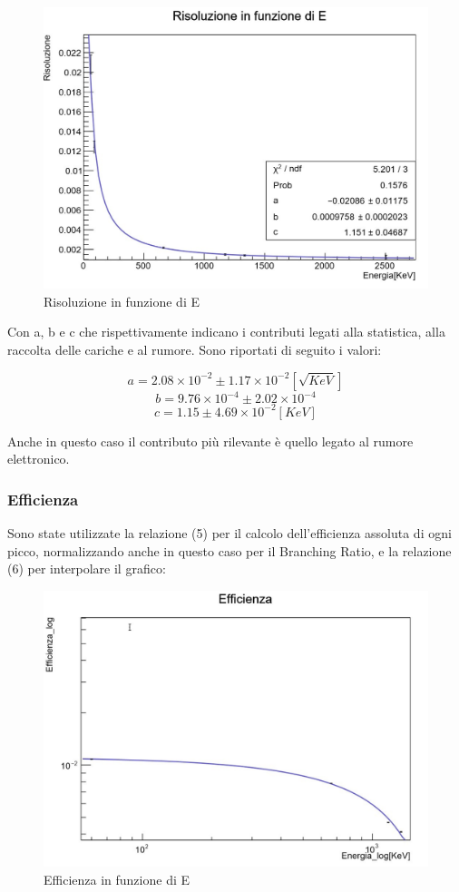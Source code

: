 \documentclass[a4paper,10pt]{article}
\begin{document}
\begin{figure}[H]
    \centering
    \includegraphics[scale=0.45]{grafici/risoluzionemultigamma}
    \caption{Risoluzione in funzione di E}
\end{figure}

Con a, b e c che rispettivamente indicano i contributi legati alla statistica, alla raccolta delle cariche e al rumore. Sono riportati di seguito i valori:

$$
	a=2.08 \times 10^{-2} \pm 1.17 \times 10^{-2} [\sqrt{KeV}]
$$
$$
	b=9.76 \times 10^{-4} \pm 2.02 \times 10^{-4}
$$
$$
	c= 1.15 \pm 4.69 \times 10^{-2} [KeV]
$$

Anche in questo caso il contributo pi\`u rilevante \`e quello legato al rumore elettronico.


\subsubsection{Efficienza}
Sono state utilizzate la relazione (5) per il calcolo dell'efficienza assoluta di ogni picco, normalizzando anche in questo caso per il Branching Ratio, e la relazione (6) per interpolare il grafico:

\begin{figure}[H]
    \centering
    \includegraphics[scale=0.45]{grafici/efficienzamultigamma}
    \caption{Efficienza in funzione di E}
\end{figure}
\end{document}
